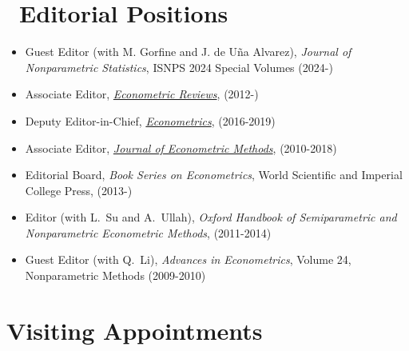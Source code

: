 \documentclass[
]{article}
\begin{document}
\section*{\texorpdfstring{\faBookOpen~Editorial
Positions}{~Editorial Positions}}\label{editorial-positions}

\begin{itemize}
\item
  Guest Editor (with M. Gorfine and J. de Uña Alvarez), \emph{Journal of
  Nonparametric Statistics}, ISNPS 2024 Special Volumes (2024-)
\item
  Associate Editor,
  \href{http://www.tandfonline.com/action/journalInformation?show=editorialBoard&journalCode=lecr20}{\emph{Econometric
  Reviews}}, (2012-)
\item
  Deputy Editor-in-Chief,
  \href{http://www.mdpi.com/journal/econometrics/editors}{\emph{Econometrics}},
  (2016-2019)
\item
  Associate Editor,
  \href{http://www.degruyter.com/view/j/jem}{\emph{Journal of
  Econometric Methods}}, (2010-2018)
\item
  Editorial Board, \emph{Book Series on Econometrics}, World Scientific
  and Imperial College Press, (2013-)
\item
  Editor (with L.~Su and A.~Ullah), \emph{Oxford Handbook of
  Semiparametric and Nonparametric Econometric Methods}, (2011-2014)
\item
  Guest Editor (with Q.~Li), \emph{Advances in Econometrics}, Volume 24,
  Nonparametric Methods (2009-2010)
\end{itemize}

\section*{Visiting Appointments}\label{visiting-appointments}
\end{document}
